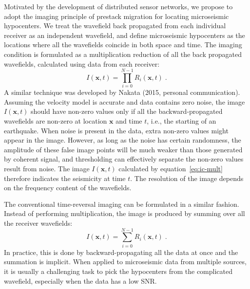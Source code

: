 Motivated by the development of distributed sensor networks, we propose to adopt the imaging principle of prestack migration for locating microseismic hypocenters. We treat the wavefield back propagated from each individual receiver as an independent wavefield, and define microseismic hypocenters as the locations where all the wavefields coincide in both space and time. The imaging condition is formulated as a multiplication reduction of all the back propagated wavefields, calculated using data from each receiver:
\begin{equation}
\label{eq:ic-mult}
I(\mathbf{x},t) = \prod\limits_{i=0}^{N-1} R_i(\mathbf{x},t) \; .
\end{equation}
A similar technique was developed by Nakata (2015, personal communication). Assuming the velocity model is accurate and data contains zero noise, the image $I(\mathbf{x},t)$ should have non-zero values only if all the backward-propagated wavefields are non-zero at location $\mathbf{x}$ and time $t$, i.e., the starting of an earthquake. When noise is present in the data, extra non-zero values might appear in the image. However, as long as the noise has certain randomness, the amplitude of these false image points will be much weaker than those generated by coherent signal, and thresholding can effectively separate the non-zero values result from noise. The image $I(\mathbf{x},t)$ calculated by equation~\ref{eq:ic-mult} therefore indicates the seismicity at time $t$. The resolution of the image depends on the frequency content of the wavefields.

The conventional time-reversal imaging can be formulated in a similar fashion. Instead of performing multiplication, the image is produced by summing over all the receiver wavefields:
\begin{equation}
\label{eq:ic-sum}
I(\mathbf{x},t) = \sum\limits_{i=0}^{N-1} R_i(\mathbf{x},t) \; .
\end{equation}
In practice, this is done by backward-propagating all the data at once and the summation is implicit. When applied to microseismic data from multiple sources, it is usually a challenging task to pick the hypocenters from the complicated wavefield, especially when the data has a low SNR.

